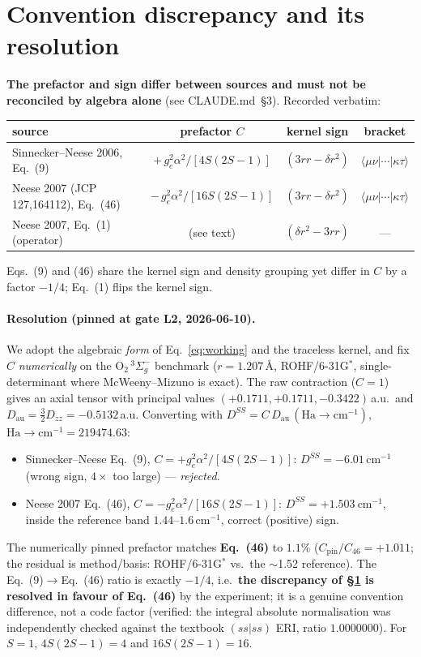\documentclass[11pt]{article}
\begin{document}
\section{Convention discrepancy and its resolution}\label{sec:conv}
\textbf{The prefactor and sign differ between sources and must not be reconciled by algebra alone}
(see CLAUDE.md~\S3). Recorded verbatim:
\begin{center}
\begin{tabular}{@{}lccc@{}}
\toprule
source & prefactor $C$ & kernel sign & bracket \\
\midrule
Sinnecker--Neese 2006, Eq.~(9) & $+\,g_e^2\alpha^2/[4S(2S-1)]$ & $(3rr-\delta r^2)$ & $\langle\mu\nu|\cdots|\kappa\tau\rangle$ \\
Neese 2007 (JCP 127,164112), Eq.~(46) & $-\,g_e^2\alpha^2/[16S(2S-1)]$ & $(3rr-\delta r^2)$ & $\langle\mu\nu|\cdots|\kappa\tau\rangle$ \\
Neese 2007, Eq.~(1) (operator) & (see text) & $(\delta r^2-3rr)$ & --- \\
\bottomrule
\end{tabular}
\end{center}
Eqs.~(9) and (46) share the kernel sign and density grouping yet differ in $C$ by a factor
$-1/4$; Eq.~(1) flips the kernel sign.

\paragraph{Resolution (pinned at gate L2, 2026-06-10).} We adopt the algebraic \emph{form} of
Eq.~\eqref{eq:working} and the traceless kernel, and fix $C$ \emph{numerically} on the
O$_2\,{}^3\Sigma_g^-$ benchmark ($r=1.207$\,\AA, ROHF/6-31G$^*$, single-determinant where
McWeeny--Mizuno is exact). The raw contraction ($C=1$) gives an axial tensor with principal values
$(+0.1711,+0.1711,-0.3422)$\,a.u.\ and $D_\mathrm{au}=\tfrac32 D_{zz}=-0.5132$\,a.u. Converting with
$D^{SS}=C\,D_\mathrm{au}\,(\mathrm{Ha}\!\to\!\mathrm{cm}^{-1})$, $\mathrm{Ha}\!\to\!\mathrm{cm}^{-1}=219474.63$:
\begin{itemize}
  \item Sinnecker--Neese Eq.~(9), $C=+g_e^2\alpha^2/[4S(2S-1)]$: $D^{SS}=-6.01$\,cm$^{-1}$
        (wrong sign, $4\times$ too large) --- \emph{rejected}.
  \item Neese 2007 Eq.~(46), $C=-g_e^2\alpha^2/[16S(2S-1)]$: $\boxed{D^{SS}=+1.503\ \mathrm{cm}^{-1}}$,
        inside the reference band $1.44$--$1.6$\,cm$^{-1}$, correct (positive) sign.
\end{itemize}
The numerically pinned prefactor matches \textbf{Eq.~(46)} to $1.1\%$ ($C_\mathrm{pin}/C_{46}=+1.011$;
the residual is method/basis: ROHF/6-31G$^*$ vs.\ the $\sim$1.52 reference). The Eq.~(9)$\to$Eq.~(46)
ratio is exactly $-1/4$, i.e.\ \textbf{the discrepancy of \S\ref{sec:conv} is resolved in favour of
Eq.~(46)} by the experiment; it is a genuine convention difference, not a code factor (verified: the
integral absolute normalisation was independently checked against the textbook $(ss|ss)$ ERI,
ratio $1.0000000$). For $S=1$, $4S(2S-1)=4$ and $16S(2S-1)=16$.
\end{document}
